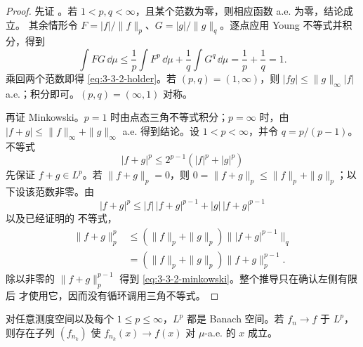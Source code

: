 \begin{proof}
先证 \Holder{}。若 $1<p,q<\infty$，且某个范数为零，则相应函数 a.e. 为零，结论成立。
其余情形令 $F=|f|/\|f\|_p$、$G=|g|/\|g\|_q$。逐点应用 Young 不等式并积分，得到
\[
 \int FG\,\dd\mu
 \le\frac1p\int F^p\,\dd\mu+\frac1q\int G^q\,\dd\mu
 =\frac1p+\frac1q=1.
\]
乘回两个范数即得 \eqref{eq:3-3-2-holder}。若 $(p,q)=(1,\infty)$，则
$|fg|\le\|g\|_\infty|f|$ a.e.；积分即可。$(p,q)=(\infty,1)$ 对称。

再证 Minkowski。$p=1$ 时由点态三角不等式积分；$p=\infty$ 时，由
$|f+g|\le\|f\|_\infty+\|g\|_\infty$ a.e. 得到结论。设 $1<p<\infty$，并令
$q=p/(p-1)$。不等式
\[
 |f+g|^p\le2^{p-1}(|f|^p+|g|^p)
\]
先保证 $f+g\in L^p$。若 $\|f+g\|_p=0$，则
$0=\|f+g\|_p\le\|f\|_p+\|g\|_p$；以下设该范数非零。由
\[
 |f+g|^p
 \le |f|\,|f+g|^{p-1}+|g|\,|f+g|^{p-1}
\]
以及已经证明的 \Holder{} 不等式，
\[
 \begin{aligned}
 \|f+g\|_p^p
 &\le(\|f\|_p+\|g\|_p)
       \bigl\||f+g|^{p-1}\bigr\|_q\\
 &=(\|f\|_p+\|g\|_p)\|f+g\|_p^{p-1}.
 \end{aligned}
\]
除以非零的 $\|f+g\|_p^{p-1}$ 得到 \eqref{eq:3-3-2-minkowski}。整个推导只在确认左侧有限后
才使用它，因而没有循环调用三角不等式。
\end{proof}

\begin{theorem}\label{theorem:3-3-2-3}
对任意测度空间以及每个 $1\le p\le\infty$，$L^p$ 都是 Banach 空间。若
$f_n\to f$ 于 $L^p$，则存在子列 $(f_{n_k})$ 使
$f_{n_k}(x)\to f(x)$ 对 $\mu$-a.e. 的 $x$ 成立。
\end{theorem}

